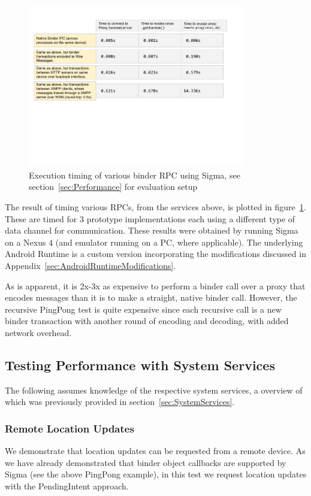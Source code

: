 \documentclass[prodmode]{acmlarge}
\begin{document}
\begin{figure}[h]
\centering
\includegraphics[width=0.85\textwidth]{drawings/Performance.pdf}
\caption{Execution timing of various binder RPC using Sigma, see section~\ref{sec:Performance} for evaluation setup}
\label{fig:performance}
\end{figure}

The result of timing various RPCs, from the services above, is plotted in figure~\ref{fig:performance}. These are timed for 3 prototype implementations each using a different type of data channel for communication. These results were obtained by running Sigma on a Nexus 4 (and emulator running on a PC, where applicable). The underlying Android Runtime is a custom version incorporating the modifications discussed in Appendix~\ref{sec:AndroidRuntimeModifications}.

As is apparent, it is 2x-3x as expensive to perform a binder call over a proxy that encodes messages than it is to make a straight, native binder call. However, the recursive PingPong test is quite expensive since each recursive call is a new binder transaction with another round of encoding and decoding, with added network overhead.

\subsection{Testing Performance with System Services}

The following assumes knowledge of the respective system services, a overview of which was previously provided in section~\ref{sec:SystemServices}.

\subsubsection{Remote Location Updates}
\label{sec:location_sharing}
We demonstrate that location updates can be requested from a remote device. As we have already demonstrated that binder object callbacks are supported by Sigma (see the above PingPong example), in this test we request location updates with the PendingIntent approach.
\end{document}
